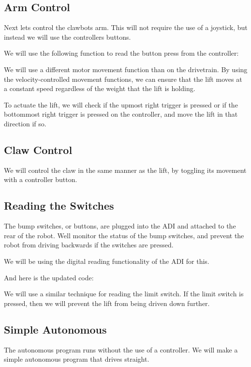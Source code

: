 \subsection*{Arm Control}

Next let\textquotesingle{}s control the clawbot\textquotesingle{}s arm. This will not require the use of a joystick, but instead we will use the controller\textquotesingle{}s buttons.

We will use the following function to read the button press from the controller\+:

We will use a different motor movement function than on the drivetrain. By using the velocity-\/controlled movement functions, we can ensure that the lift moves at a constant speed regardless of the weight that the lift is holding.

To actuate the lift, we will check if the upmost right trigger is pressed or if the bottommost right trigger is pressed on the controller, and move the lift in that direction if so.

\subsection*{Claw Control}

We will control the claw in the same manner as the lift, by toggling its movement with a controller button.

\subsection*{Reading the Switches}

The bump switches, or buttons, are plugged into the A\+DI and attached to the rear of the robot. We\textquotesingle{}ll monitor the status of the bump switches, and prevent the robot from driving backwards if the switches are pressed.

We will be using the digital reading functionality of the A\+DI for this.

And here is the updated code\+:

We will use a similar technique for reading the limit switch. If the limit switch is pressed, then we will prevent the lift from being driven down further.

\subsection*{Simple Autonomous}

The autonomous program runs without the use of a controller. We will make a simple autonomous program that drives straight. 